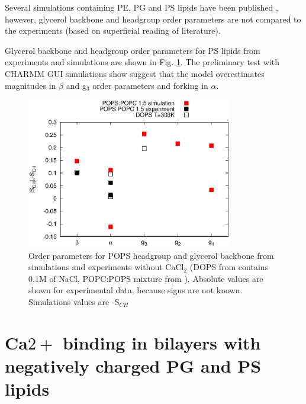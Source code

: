 \documentclass[aps,prl,superscriptaddress,twocolumn]{revtex4}
\begin{document}
Several simulations containing PE, PG and PS lipids have been published \cite{??},
however, glycerol backbone and headgroup order parameters are not compared to
the experiments (based on superficial reading of literature).

Glycerol backbone and headgroup order parameters for PS lipids from experiments
and simulations are shown in Fig. \ref{HGorderParametersPOPS}.
The preliminary test with CHARMM GUI simulations show suggest that the model
overestimates magnitudes in $\beta$ and g$_3$ order parameters and forking in $\alpha$.
\begin{figure}[]
  \centering
  \includegraphics[width=9.0cm]{../Figs/HGorderparametersPOPS.eps}
  \caption{\label{HGorderParametersPOPS}
    Order parameters for POPS headgroup and glycerol backbone from simulations and experiments without CaCl$_2$ 
    (DOPS from \cite{browning80} contains 0.1M of NaCl, POPC:POPS mixture from \cite{roux90}).
    Absolute values are shown for experimental data, because signs are not known.
    Simulations values are -S$_{CH}$
  }
\end{figure}



\section{Ca$2+$ binding in bilayers with negatively charged PG and PS lipids}
\end{document}
